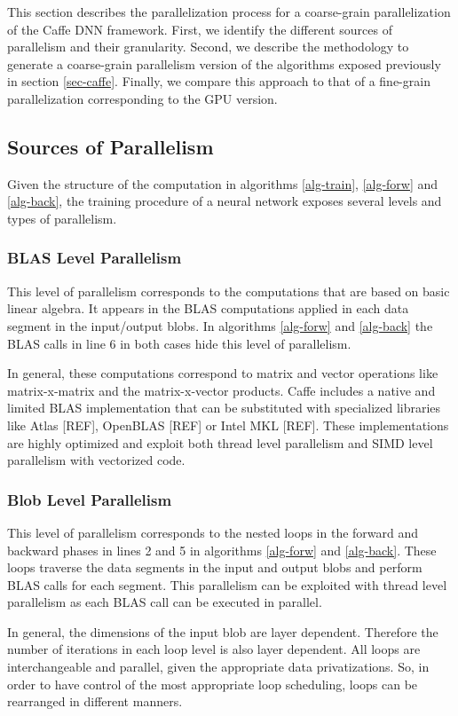 This section describes the parallelization process for a coarse-grain 
parallelization of the Caffe DNN framework. First, we identify the 
different sources of parallelism and their granularity. Second, we 
describe the methodology to generate a coarse-grain parallelism version 
of the algorithms exposed previously in section \ref{sec-caffe}. Finally, 
we compare this approach to that of a fine-grain parallelization 
corresponding to the GPU version.

\subsection{Sources of Parallelism}
Given the structure of the computation in algorithms \ref{alg-train}, 
\ref{alg-forw} and \ref{alg-back}, the training procedure of a neural 
network exposes several levels and types of parallelism.

\subsubsection{BLAS Level Parallelism}
This level of parallelism corresponds to the computations that 
are based on basic linear algebra. It appears in the 
BLAS computations applied in each data segment in the input/output blobs.
In algorithms \ref{alg-forw} and \ref{alg-back} the BLAS calls in line 
6 in both cases hide this level of parallelism.

In general, these computations correspond to matrix and
vector operations like matrix-x-matrix and the matrix-x-vector
products. Caffe includes a native and limited BLAS implementation that 
can be substituted with specialized libraries like Atlas
[REF], OpenBLAS [REF] or Intel MKL [REF]. These implementations are 
highly optimized and exploit both thread level parallelism and SIMD level parallelism with vectorized code.

\subsubsection{Blob Level Parallelism}
This level of parallelism corresponds to the nested loops in the forward
and backward phases in lines 2 and 5 in algorithms 
\ref{alg-forw} and \ref{alg-back}. 
These loops traverse the data segments in the input and output blobs and
perform BLAS calls for each segment. This parallelism can be
exploited with thread level parallelism as each BLAS call can be
executed in parallel.

In general, the dimensions of the input blob are layer dependent. Therefore the number of iterations in each loop level is also layer dependent. All loops are 
interchangeable and parallel, given the appropriate data privatizations. 
So, in order to have control of the most appropriate loop scheduling, 
loops can be rearranged in different manners. 

